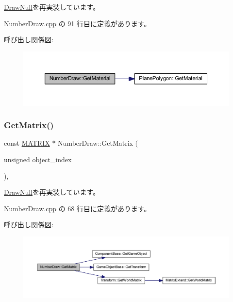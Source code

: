 \mbox{\hyperlink{class_draw_null_a84969d22d3436986f214e9896fe44fc6}{Draw\+Null}}を再実装しています。



 Number\+Draw.\+cpp の 91 行目に定義があります。

呼び出し関係図\+:\nopagebreak
\begin{figure}[H]
\begin{center}
\leavevmode
\includegraphics[width=350pt]{class_number_draw_a3348d9d1cdd9dd03be25b82069275ca5_cgraph}
\end{center}
\end{figure}
\mbox{\label{class_number_draw_a78f50afa05e728811d89a491f5eec899}} 
\subsubsection{\texorpdfstring{Get\+Matrix()}{GetMatrix()}}
{\footnotesize\ttfamily const \mbox{\hyperlink{_vector3_d_8h_a032295cd9fb1b711757c90667278e744}{M\+A\+T\+R\+IX}} $\ast$ Number\+Draw\+::\+Get\+Matrix (\begin{DoxyParamCaption}\item[{unsigned}]{object\+\_\+index }\end{DoxyParamCaption})\hspace{0.3cm}{\ttfamily [override]}, {\ttfamily [virtual]}}



\mbox{\hyperlink{class_draw_null_adede079e9c11a756090740b20bb43022}{Draw\+Null}}を再実装しています。



 Number\+Draw.\+cpp の 68 行目に定義があります。

呼び出し関係図\+:\nopagebreak
\begin{figure}[H]
\begin{center}
\leavevmode
\includegraphics[width=350pt]{class_number_draw_a78f50afa05e728811d89a491f5eec899_cgraph}
\end{center}
\end{figure}
\mbox{\label{class_number_draw_a8234fb06d885feaa8a2f0ecf256db9a0}} 
